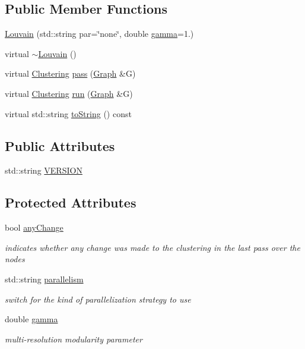 \subsection*{Public Member Functions}
\begin{DoxyCompactItemize}
\item 
\hyperlink{class_networ_kit_1_1_louvain_ae4492db99987ea028e9672b2089c1ecf}{Louvain} (std\-::string par=\char`\"{}none\char`\"{}, double \hyperlink{class_networ_kit_1_1_louvain_a00ffd530fd5822182b4d54535eca210d}{gamma}=1.)
\item 
virtual \hyperlink{class_networ_kit_1_1_louvain_a31031bd1cab70940668a08ea7da75a20}{$\sim$\-Louvain} ()
\item 
virtual \hyperlink{class_networ_kit_1_1_clustering}{Clustering} \hyperlink{class_networ_kit_1_1_louvain_a40251120e85c77c17e53713435653fe7}{pass} (\hyperlink{class_networ_kit_1_1_graph}{Graph} \&G)
\item 
virtual \hyperlink{class_networ_kit_1_1_clustering}{Clustering} \hyperlink{class_networ_kit_1_1_louvain_a493a2aba661d7c4dec2b573f963f800d}{run} (\hyperlink{class_networ_kit_1_1_graph}{Graph} \&G)
\item 
virtual std\-::string \hyperlink{class_networ_kit_1_1_louvain_a6c7b4f56e6aea10e481f7fe7e91b43b8}{to\-String} () const 
\end{DoxyCompactItemize}
\subsection*{Public Attributes}
\begin{DoxyCompactItemize}
\item 
std\-::string \hyperlink{class_networ_kit_1_1_louvain_ae706eb92187681093cc5b3ff2f06c175}{V\-E\-R\-S\-I\-O\-N}
\end{DoxyCompactItemize}
\subsection*{Protected Attributes}
\begin{DoxyCompactItemize}
\item 
bool \hyperlink{class_networ_kit_1_1_louvain_a2531d4e703305b7a4b6ea1ca67450a0d}{any\-Change}
\begin{DoxyCompactList}\small\item\em indicates whether any change was made to the clustering in the last pass over the nodes \end{DoxyCompactList}\item 
std\-::string \hyperlink{class_networ_kit_1_1_louvain_ad690b266426199e76caefd234ea53397}{parallelism}
\begin{DoxyCompactList}\small\item\em switch for the kind of parallelization strategy to use \end{DoxyCompactList}\item 
double \hyperlink{class_networ_kit_1_1_louvain_a00ffd530fd5822182b4d54535eca210d}{gamma}
\begin{DoxyCompactList}\small\item\em multi-\/resolution modularity parameter \end{DoxyCompactList}\end{DoxyCompactItemize}


